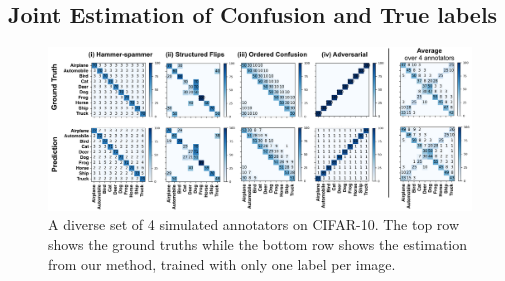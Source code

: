 \subsection{Joint Estimation of Confusion and True labels}
\begin{figure}[h]
    \begin{center}
		\includegraphics[width=\linewidth]{chapter_4/figures/figure_cifar10_visualization_of_confusion_matrices_03.png}
	\end{center}
	\vspace{-6mm}
	\caption{\small A diverse set of 4 simulated annotators on CIFAR-10. The top row shows the ground truths while the bottom row shows the estimation from our method, trained with only one label per image. }
	 \label{fig:recover_cms}
\end{figure}

